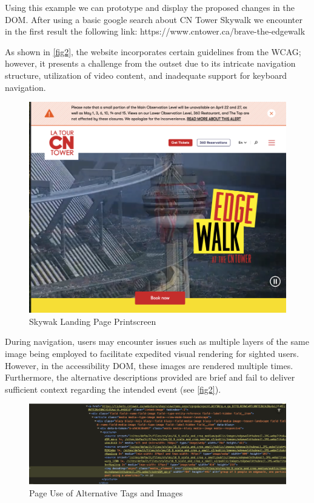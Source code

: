 \documentclass[conference]{IEEEtran}
\begin{document}
 Using this example we can prototype and display the proposed changes in the DOM. After using a basic google search about CN Tower Skywalk we encounter in the first result the following link:
 https://www.cntower.ca/brave-the-edgewalk

 As shown in \autoref{fig2}, the website incorporates certain guidelines from the WCAG; however, it presents a challenge from the outset due to its intricate navigation structure, utilization of video content, and inadequate support for keyboard navigation.

\begin{figure}[h]
\centerline{\includegraphics[width=\linewidth]{images/1.png}}
\caption{Skywak Landing Page Printscreen}
\label{fig2}
\end{figure}

During navigation, users may encounter issues such as multiple layers of the same image being employed to facilitate expedited visual rendering for sighted users. However, in the accessibility DOM, these images are rendered multiple times. Furthermore, the alternative descriptions provided are brief and fail to deliver sufficient context regarding the intended event (see \autoref{fig2}).

\begin{figure}[h]
\centerline{\includegraphics[width=\linewidth]{images/2.png}}
\caption{Page Use of Alternative Tags and Images}
\label{fig3}
\end{figure}
\end{document}
